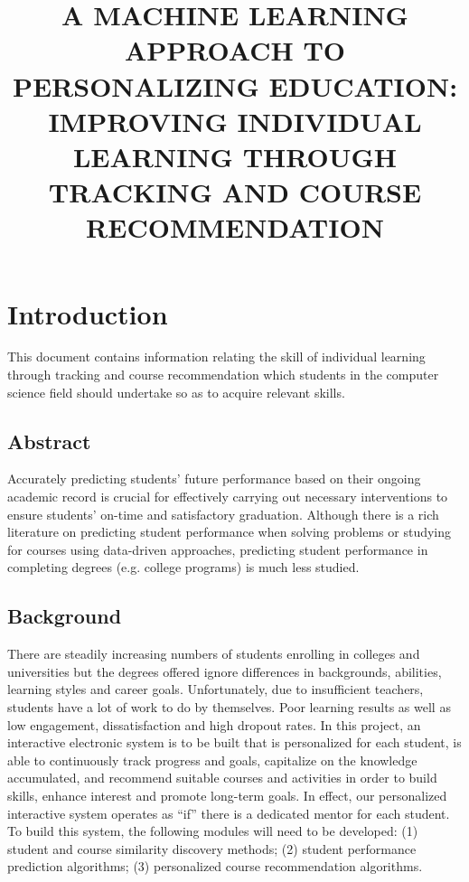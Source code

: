 \documentclass{article}
\begin{document}
\title{A MACHINE LEARNING APPROACH TO PERSONALIZING EDUCATION: IMPROVING INDIVIDUAL LEARNING THROUGH TRACKING AND COURSE RECOMMENDATION}
\author{}
\maketitle

\section{Introduction}
This document contains information relating the skill of individual learning through tracking and course recommendation which students in the computer science field should undertake so as to acquire relevant skills.
\subsection{Abstract}
Accurately predicting students’ future performance based on their ongoing academic record is crucial for effectively carrying out necessary interventions to ensure students’
on-time and satisfactory graduation. Although there is a rich literature on predicting student performance when solving problems or studying for courses using data-driven approaches,
predicting student performance in completing degrees (e.g. college programs) is much less studied.

\subsection{Background}
There are steadily increasing numbers of students enrolling in colleges and universities but the degrees offered ignore differences in backgrounds, abilities, learning styles and career goals. Unfortunately, due to insufficient teachers, students have a lot of work to  do by themselves. Poor learning results as well as low engagement, dissatisfaction and high dropout rates. In this project, an interactive electronic system is to be built that is personalized for each student, is able to continuously track progress and goals, capitalize on the knowledge accumulated, and recommend suitable courses and activities in order to build skills, enhance interest and promote  long-term goals. In effect, our personalized interactive system operates as “if” there is a dedicated mentor for each student. To build this system, the following modules will need to be developed: (1) student and course similarity discovery methods; (2) student performance prediction algorithms; (3) personalized course recommendation algorithms.
\end{document}
